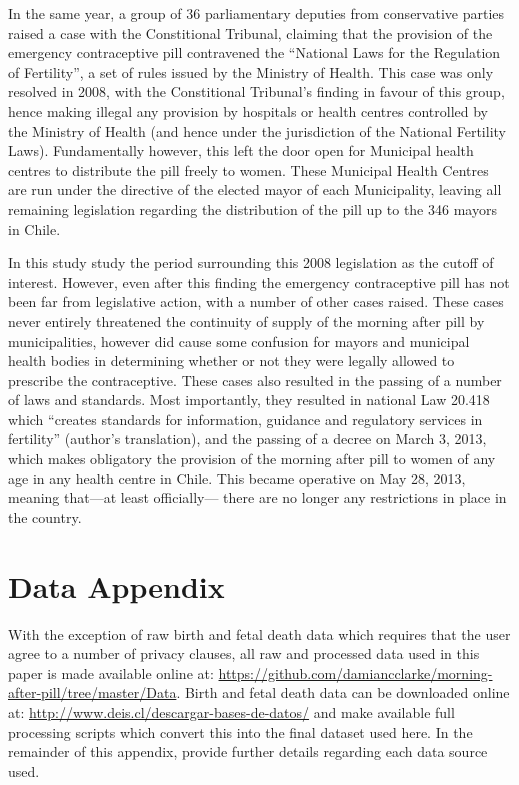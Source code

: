 In the same year, a group of 36 parliamentary deputies from conservative 
parties raised a case with the Constitional Tribunal, claiming that the 
provision of the emergency contraceptive pill contravened the ``National Laws
for the Regulation of Fertility'', a set of rules issued by the Ministry of
Health.  This case was only resolved in 2008, with the Constitional Tribunal's
finding in favour of this group, hence making illegal any provision by 
hospitals or health centres controlled by the Ministry of Health (and hence
under the jurisdiction of the National Fertility Laws).  Fundamentally however,
this left the door open for Municipal health centres to distribute the pill
freely to women.  These Municipal Health Centres are run under the directive
of the elected mayor of each Municipality, leaving all remaining legislation 
regarding the distribution of the pill up to the 346 mayors in Chile.

In this study \Person study the period surrounding this 2008 legislation as the 
cutoff of interest.  However, even after this finding the emergency 
contraceptive pill has not been far from legislative action, with a number of
other cases raised.  These cases never entirely threatened the continuity of
supply of the morning after pill by municipalities, however did cause some
confusion for mayors and municipal health bodies in determining whether or not
they were legally allowed to prescribe the contraceptive.  These cases also
resulted in the passing of a number of laws and standards.  Most importantly,
they resulted in national Law 20.418 which ``creates standards for information,
guidance and regulatory services in fertility'' (author's translation), and 
the passing of a decree on March 3, 2013, which makes obligatory the provision
of the morning after pill to women of any age in any health centre in Chile.  
This became operative on May 28, 2013, meaning that---at least officially---%
there are no longer any restrictions in place in the country.

\section{Data Appendix}
With the exception of raw birth and fetal death data which requires that the
user agree to a number of privacy clauses, all raw and processed data used in
this paper is made available online at: 
\url{https://github.com/damiancclarke/morning-after-pill/tree/master/Data}.
Birth and fetal death data can be downloaded online at: 
\url{http://www.deis.cl/descargar-bases-de-datos/} and \person make available 
full processing scripts which convert this into the final dataset used here.  In 
the remainder of this appendix, \person provide further details regarding each 
data source used.

